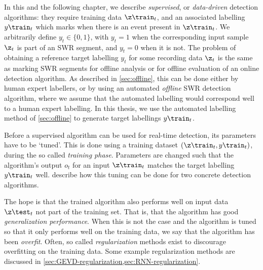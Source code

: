 
In this and the following chapter, we describe \emph{supervised}, or \emph{data-driven} detection algorithms: they require training data $\z\train_t$, and an associated labelling $y\train_t$ which marks when there is an event present in $\z\train_t$. We arbitrarily define $y_t \in \{0, 1\}$, with $y_t = 1$ when the corresponding input sample $\z_t$ is part of an SWR segment, and $y_t = 0$ when it is not. The problem of obtaining a reference target labelling $y_t$ for some recording data $\z_t$ is the same as marking SWR segments for offline analysis or for offline evaluation of an online detection algorithm. As described in \cref{sec:offline}, this can be done either by human expert labellers, or by using an automated \emph{offline} SWR detection algorithm, where we assume that the automated labelling would correspond well to a human expert labelling. In this thesis, we use the automated labelling method of \cref{sec:offline} to generate target labellings $y\train_t$.

Before a supervised algorithm can be used for real-time detection, its parameters have to be `tuned'. This is done using a training dataset $(\z\train_t, y\train_t)$, during the so called \emph{training phase}. Parameters are changed such that the algorithm's output $o_t$ for an input $\z\train_t$ matches the target labelling $y\train_t$ well.  describe how this tuning can be done for two concrete detection algorithms.

The hope is that the trained algorithm also performs well on input data $\z\test_t$ not part of the training set. That is, that the algorithm has good \emph{generalization performance}. When this is not the case and the algorithm is tuned so that it only performs well on the training data, we say that the algorithm has been \emph{overfit}. Often, so called \emph{regularization} methods exist to discourage overfitting on the training data. Some example regularization methods are discussed in \cref{sec:GEVD-regularization,sec:RNN-regularization}.
